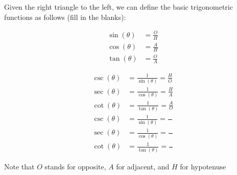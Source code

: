 \documentclass[addpoints]{exam}
\begin{document}
\begin{tcolorbox}[breakable, title=TRIG FUNCTIONS REVIEW, colframe=black, sharp corners, colback=white, colbacktitle=white, coltitle=black]
\begin{minipage}{0.25\linewidth}
        \end{minipage}
        \hfill
        \begin{minipage}{0.65\linewidth}
             Given the right triangle to the left, we can define the basic trigonometric functions as follows (fill in the blanks): \\
             \begin{minipage}{0.45\linewidth}
                 \begin{align*}
                     \sin\left(\theta\right) &= \frac{O}{H} \\
                     \cos\left(\theta\right) &= \frac{A}{H} \\ 
                     \tan\left(\theta\right) &= \frac{O}{A}
                 \end{align*}
             \end{minipage}
             \hfill
             \begin{minipage}{0.45\linewidth}
                \ifprintanswers
                    \begin{align*}
                        \csc\left(\theta\right) &= \frac{1}{\sin\left(\theta\right)} = \frac{H}{O} \\ 
                        \sec\left(\theta\right) &= \frac{1}{\cos\left(\theta\right)} = \frac{H}{A} \\ 
                        \cot\left(\theta\right) &= \frac{1}{\tan\left(\theta\right)} = \frac{A}{O}
                    \end{align*} 
                \else
                    \begin{align*}
                        \csc\left(\theta\right) &= \frac{1}{\sin\left(\theta\right)} = \frac{\phantom{H}}{\phantom{O}} \\ 
                        \sec\left(\theta\right) &= \frac{1}{\cos\left(\theta\right)} = \frac{\phantom{H}}{\phantom{A}} \\ 
                        \cot\left(\theta\right) &= \frac{1}{\tan\left(\theta\right)} = \frac{\phantom{A}}{\phantom{O}}
                    \end{align*} 
                \fi
             \end{minipage}
             \newline Note that $O$ stands for opposite, $A$ for adjacent, and $H$ for hypotenuse
        \end{minipage}

\end{tcolorbox}
\end{document}
